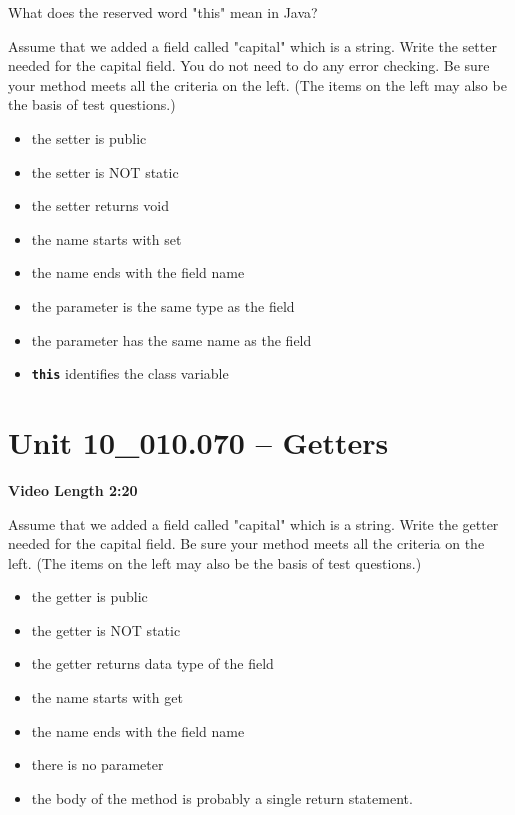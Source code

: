 \documentclass[letterpaper,12pt]{exam}
\newcommand{\unit}{Unit 10}
\begin{document}
\begin{questions}
\begin{samepage}
    \question What does the reserved word "this" mean in Java?
    \vspace{5mm}
\end{samepage}

\begin{samepage}
    \question Assume that we added a field called "capital" which is a string.  Write the setter needed for the capital field.  You do not need to do any error checking.  Be sure your method meets all the criteria on the left. (The items on the left may also be the basis of test questions.)
    \begin{itemize}
        \item the setter is public
        \item the setter is NOT static
        \item the setter returns void
        \item the name starts with set
        \item the name ends with the field name
        \item the parameter is the same type as the field
        \item the parameter has the same name as the field
        \item \texttt{\textbf{this}} identifies the class variable
    \end{itemize}
    \vspace{5mm}
\end{samepage}

\section*{\unit\_010.070 -- Getters} 
\par{\selectfont\textbf{Video Length 2:20}}
\begin{samepage}
    \question Assume that we added a field called "capital" which is a string.  Write the getter needed for the capital field.  Be sure your method meets all the criteria on the left. (The items on the left may also be the basis of test questions.)
    \begin{itemize}
        \item the getter is public
        \item the getter is NOT static
        \item the getter returns data type of the field
        \item the name starts with get
        \item the name ends with the field name
        \item there is no parameter
        \item the body of the method is probably a single return statement.
    \end{itemize}
    \vspace{5mm}
\end{samepage}


\end{questions}
\end{document}
